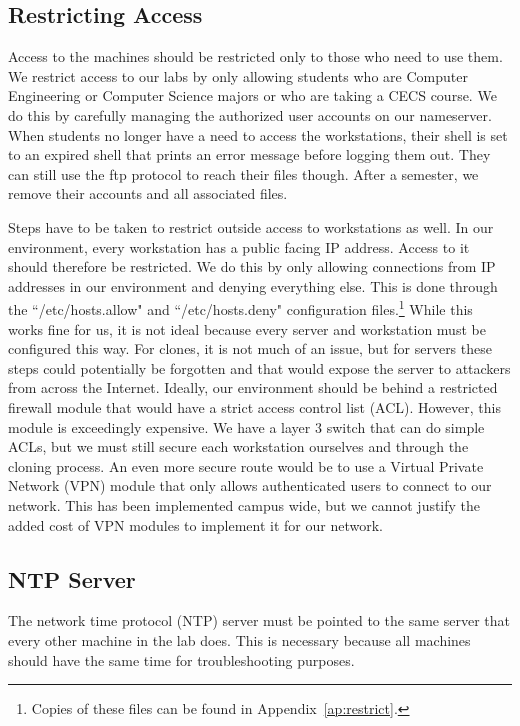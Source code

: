 \subsection{Restricting Access}
Access to the machines should be restricted only to those who need to use them.  We restrict access to our labs by only allowing students who are Computer Engineering or Computer Science majors or who are taking a CECS course.  We do this by carefully managing the authorized user accounts on our nameserver.  When students no longer have a need to access the workstations, their shell is set to an expired shell that prints an error message before logging them out.  They can still use the ftp protocol to reach their files though.  After a semester, we remove their accounts and all associated files.  

Steps have to be taken to restrict outside access to workstations as well.  In our environment, every workstation has a public facing IP address.  Access to it should therefore be restricted.  We do this by only allowing connections from IP addresses in our environment and denying everything else.  This is done through the ``/etc/hosts.allow" and ``/etc/hosts.deny" configuration files.\footnote{Copies of these files can be found in Appendix~\ref{ap:restrict}.}  While this works fine for us, it is not ideal because every server and workstation must be configured this way.  For clones, it is not much of an issue, but for servers these steps could potentially be forgotten and that would expose the server to attackers from across the Internet.  Ideally, our environment should be behind a restricted firewall module that would have a strict access control list (ACL).  However, this module is exceedingly expensive.  We have a layer 3 switch that can do simple ACLs, but we must still secure each workstation ourselves and through the cloning process.  An even more secure route would be to use a Virtual Private Network (VPN) module that only allows authenticated users to connect to our network.  This has been implemented campus wide, but we cannot justify the added cost of VPN modules to implement it for our network.

\subsection{NTP Server}
The network time protocol (NTP) server must be pointed to the same server that every other machine in the lab does.  This is necessary because all machines should have the same time for troubleshooting purposes.  

